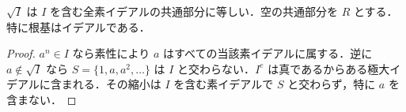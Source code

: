 \begin{prop}[根基の素イデアル表示]
$\sqrt I$ は $I$ を含む全素イデアルの共通部分に等しい．空の共通部分を $R$ とする．特に根基はイデアルである．
\end{prop}
\begin{proof}
$a^n\in I$ なら素性により $a$ はすべての当該素イデアルに属する．逆に $a\notin\sqrt I$ なら $S=\{1,a,a^2,\ldots\}$ は $I$ と交わらない．$I^e$ は真であるからある極大イデアルに含まれる．その縮小は $I$ を含む素イデアルで $S$ と交わらず，特に $a$ を含まない．
\end{proof}
